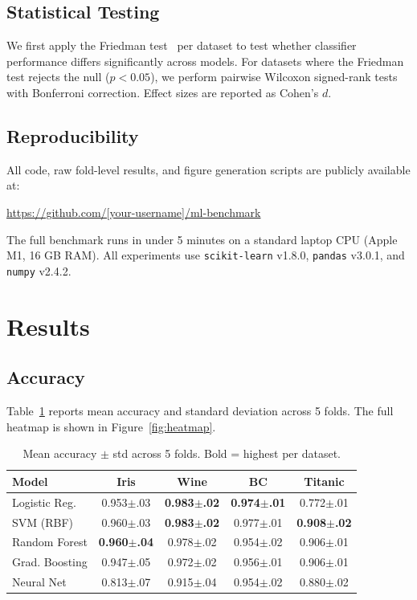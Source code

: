 \documentclass[10pt,twocolumn]{article}
\begin{document}
\subsection{Statistical Testing}

We first apply the Friedman test~\citep{friedman1940comparison} per dataset to test 
whether classifier performance differs significantly across models. 
For datasets where the Friedman test rejects the null ($p < 0.05$), we perform 
pairwise Wilcoxon signed-rank tests with Bonferroni correction.
Effect sizes are reported as Cohen's $d$.

\subsection{Reproducibility}

All code, raw fold-level results, and figure generation scripts are publicly available at:
\begin{center}
\url{https://github.com/[your-username]/ml-benchmark}
\end{center}

The full benchmark runs in under 5 minutes on a standard laptop CPU (Apple M1, 16 GB RAM). 
All experiments use \texttt{scikit-learn} v1.8.0, \texttt{pandas} v3.0.1, and 
\texttt{numpy} v2.4.2.

\section{Results}

\subsection{Accuracy}

Table~\ref{tab:accuracy} reports mean accuracy and standard deviation across 5 folds.
The full heatmap is shown in Figure~\ref{fig:heatmap}.

\begin{table}[h]
\centering
\caption{Mean accuracy $\pm$ std across 5 folds. Bold = highest per dataset.}
\label{tab:accuracy}
\small
\begin{tabular}{lcccc}
\toprule
\textbf{Model} & \textbf{Iris} & \textbf{Wine} & \textbf{BC} & \textbf{Titanic} \\
\midrule
Logistic Reg.  & 0.953$\pm$.03 & \textbf{0.983$\pm$.02} & \textbf{0.974$\pm$.01} & 0.772$\pm$.01 \\
SVM (RBF)      & 0.960$\pm$.03 & \textbf{0.983$\pm$.02} & 0.977$\pm$.01 & \textbf{0.908$\pm$.02} \\
Random Forest  & \textbf{0.960$\pm$.04} & 0.978$\pm$.02 & 0.954$\pm$.02 & 0.906$\pm$.01 \\
Grad. Boosting & 0.947$\pm$.05 & 0.972$\pm$.02 & 0.956$\pm$.01 & 0.906$\pm$.01 \\
Neural Net     & 0.813$\pm$.07 & 0.915$\pm$.04 & 0.954$\pm$.02 & 0.880$\pm$.02 \\
\bottomrule
\end{tabular}
\end{table}
\end{document}
